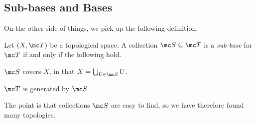 \documentclass[../notes.tex]{subfiles}
\begin{document}
\subsection{Sub-bases and Bases}
On the other side of things, we pick up the following definition.
\begin{definition}
	Let $(X,\mc T)$ be a topological space. A collection $\mc S\subseteq\mc T$ is a \textit{sub-base} for $\mc T$ if and only if the following hold.
	\begin{listalph}
		\item $\mc S$ covers $X$, in that $X=\bigcup_{U\in\mc S}U$.
		\item $\mc T$ is generated by $\mc S$.
	\end{listalph}
\end{definition}
The point is that collections $\mc S$ are easy to find, so we have therefore found many topologies.
\end{document}
